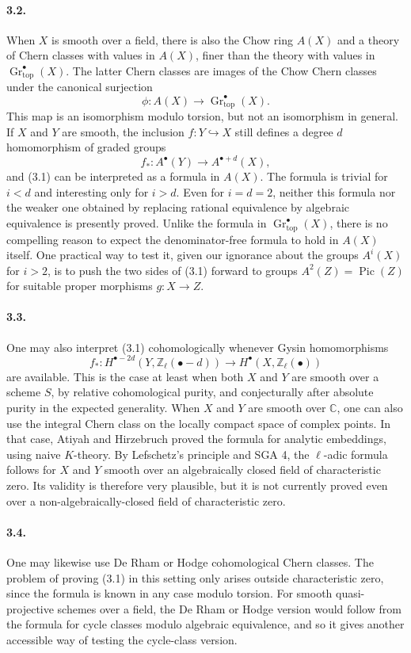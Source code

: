 \documentclass[11pt]{article}
\theoremstyle{plain}
\theoremstyle{definition}
\theoremstyle{remark}
\newcommand{\CC}{\mathbb C}
\newcommand{\ZZ}{\mathbb Z}
\DeclareMathOperator{\Pic}{Pic}
\DeclareMathOperator{\Gr}{Gr}
\newcommand{\longto}{\longrightarrow}
\providecommand{\topf}{\mathrm{top}}
\begin{document}
\paragraph{3.2.}
When $X$ is smooth over a field, there is also the Chow ring $A(X)$ and a theory of Chern classes with values in $A(X)$, finer than the theory with values in $\Gr^\bullet_{\topf}(X)$. The latter Chern classes are images of the Chow Chern classes under the canonical surjection
\[
\phi:A(X)\longto \Gr^\bullet_{\topf}(X).
\]
This map is an isomorphism modulo torsion, but not an isomorphism in general. If $X$ and $Y$ are smooth, the inclusion $f:Y\hookrightarrow X$ still defines a degree $d$ homomorphism of graded groups
\[
f_*:A^\bullet(Y)\longto A^{\bullet+d}(X),
\]
and (3.1) can be interpreted as a formula in $A(X)$. The formula is trivial for $i<d$ and interesting only for $i>d$. Even for $i=d=2$, neither this formula nor the weaker one obtained by replacing rational equivalence by algebraic equivalence is presently proved. Unlike the formula in $\Gr^\bullet_{\topf}(X)$, there is no compelling reason to expect the denominator-free formula to hold in $A(X)$ itself. One practical way to test it, given our ignorance about the groups $A^i(X)$ for $i>2$, is to push the two sides of (3.1) forward to groups $A^2(Z)=\Pic(Z)$ for suitable proper morphisms $g:X\to Z$.

\paragraph{3.3.}
One may also interpret (3.1) cohomologically whenever Gysin homomorphisms
\[
f_*:H^{\bullet-2d}(Y,\ZZ_\ell(\bullet-d))
   \longto H^\bullet(X,\ZZ_\ell(\bullet))
\]
are available. This is the case at least when both $X$ and $Y$ are smooth over a scheme $S$, by relative cohomological purity, and conjecturally after absolute purity in the expected generality. When $X$ and $Y$ are smooth over $\CC$, one can also use the integral Chern class on the locally compact space of complex points. In that case, Atiyah and Hirzebruch proved the formula for analytic embeddings, using naive $K$-theory. By Lefschetz's principle and SGA 4, the $\ell$-adic formula follows for $X$ and $Y$ smooth over an algebraically closed field of characteristic zero. Its validity is therefore very plausible, but it is not currently proved even over a non-algebraically-closed field of characteristic zero.

\paragraph{3.4.}
One may likewise use De Rham or Hodge cohomological Chern classes. The problem of proving (3.1) in this setting only arises outside characteristic zero, since the formula is known in any case modulo torsion. For smooth quasi-projective schemes over a field, the De Rham or Hodge version would follow from the formula for cycle classes modulo algebraic equivalence, and so it gives another accessible way of testing the cycle-class version.
\end{document}
